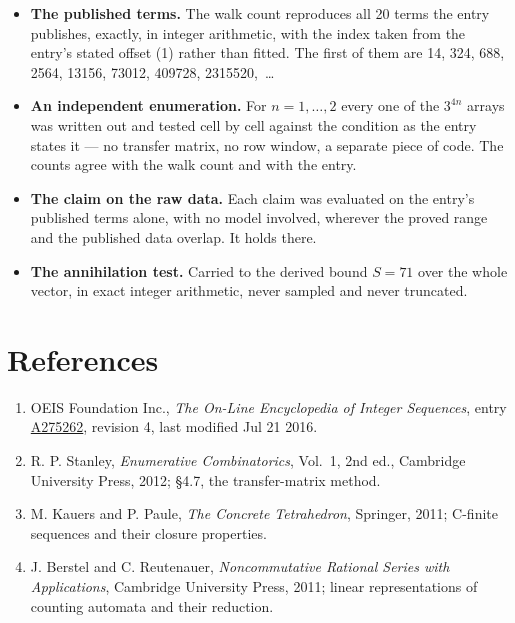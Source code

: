 \documentclass[11pt]{article}
\theoremstyle{definition}
\begin{document}
\begin{itemize}

\item {\bfseries The published terms.} The walk count reproduces all 20 terms the entry publishes, exactly, in integer arithmetic, with the index taken from the entry's stated offset (1) rather than fitted. The first of them are 14, 324, 688, 2564, 13156, 73012, 409728, 2315520,~\dots

\item {\bfseries An independent enumeration.} For $n = 1,\dots,2$ every one of the $3^{4n}$ arrays was written out and tested cell by cell against the condition as the entry states it --- no transfer matrix, no row window, a separate piece of code. The counts agree with the walk count and with the entry.

\item {\bfseries The claim on the raw data.} Each claim was evaluated on the entry's published terms alone, with no model involved, wherever the proved range and the published data overlap. It holds there.

\item {\bfseries The annihilation test.} Carried to the derived bound $S = 71$ over the whole vector, in exact integer arithmetic, never sampled and never truncated.

\end{itemize}

\section{References}

\begin{enumerate}

\item OEIS Foundation Inc., \emph{The On-Line Encyclopedia of Integer Sequences}, entry \href{https://oeis.org/A275262}{A275262}, revision 4, last modified Jul 21 2016.

\item R. P. Stanley, \emph{Enumerative Combinatorics}, Vol.~1, 2nd ed., Cambridge University Press, 2012; \S4.7, the transfer-matrix method.

\item M. Kauers and P. Paule, \emph{The Concrete Tetrahedron}, Springer, 2011; C-finite sequences and their closure properties.

\item J. Berstel and C. Reutenauer, \emph{Noncommutative Rational Series with Applications}, Cambridge University Press, 2011; linear representations of counting automata and their reduction.

\end{enumerate}
\end{document}
